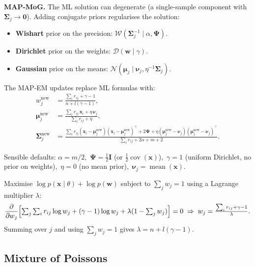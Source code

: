 \documentclass[11pt, oneside]{book}
\newcommand{\T}{^{\top}}
\begin{document}
\textbf{MAP-MoG.}
The ML solution can degenerate (a single-sample component with $\bm{\Sigma}_j\to\bm{0}$).
Adding conjugate priors regularises the solution:
\begin{itemize}
  \item \textbf{Wishart} prior on the precision: $\mathcal{W}(\bm{\Sigma}_j^{-1}\mid\alpha,\bm{\Psi})$.
  \item \textbf{Dirichlet} prior on the weights: $\mathcal{D}(\bm{w}\mid\gamma)$.
  \item \textbf{Gaussian} prior on the means: $\mathcal{N}(\bm{\mu}_j\mid\bm{\nu}_j,\eta^{-1}\bm{\Sigma}_j)$.
\end{itemize}
The MAP-EM updates replace ML formulas with:
\begin{align*}
  w_j^{\text{new}} &= \frac{\displaystyle\sum_i r_{ij} + \gamma - 1}{n + l(\gamma-1)},\\[4pt]
  \bm{\mu}_j^{\text{new}} &= \frac{\displaystyle\sum_i r_{ij}\,\bm{x}_i + \eta\,\bm{\nu}_j}
                                  {\displaystyle\sum_i r_{ij} + \eta},\\[4pt]
  \bm{\Sigma}_j^{\text{new}} &= \frac{\displaystyle\sum_i r_{ij}
      (\bm{x}_i-\bm{\mu}_j^{\text{new}})(\bm{x}_i-\bm{\mu}_j^{\text{new}})\T
      + 2\bm{\Psi} + \eta(\bm{\mu}_j^{\text{new}}-\bm{\nu}_j)(\bm{\mu}_j^{\text{new}}-\bm{\nu}_j)\T}
    {\displaystyle\sum_i r_{ij} + 2\alpha + m + 2}.
\end{align*}

Sensible defaults: $\alpha=m/2$,\ $\bm{\Psi}=\tfrac{1}{2}\bm{I}$ (or
$\tfrac{1}{2}\operatorname{cov}(\bm{x})$),\ $\gamma=1$ (uniform Dirichlet,
no prior on weights),\ $\eta=0$ (no mean prior),\ $\bm{\nu}_j=\operatorname{mean}(\bm{x})$.

\begin{intbox}[title={Deriving the MAP weight update}]
Maximise $\log p(\bm{x}\mid\theta) + \log p(\bm{w})$ subject to
$\sum_j w_j = 1$ using a Lagrange multiplier $\lambda$:
\[
  \frac{\partial}{\partial w_j}\Bigl[\textstyle\sum_j\sum_i r_{ij}\log w_j
    + (\gamma-1)\log w_j + \lambda(1-\textstyle\sum_j w_j)\Bigr] = 0
  \;\Rightarrow\;
  w_j = \frac{\sum_i r_{ij}+\gamma-1}{\lambda}.
\]
Summing over $j$ and using $\sum_j w_j=1$ gives $\lambda = n+l(\gamma-1)$.
\end{intbox}

\subsection{Mixture of Poissons}
\end{document}
